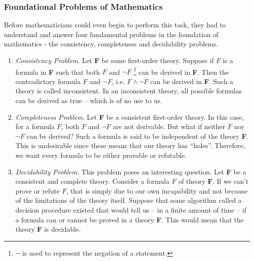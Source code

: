 \documentclass[a4paper, 12pt]{article}
\theoremstyle{definition}
\begin{document}
    \subsubsection*{Foundational Problems of Mathematics}
    \vspace{-0.75 em}
    Before mathematicians could even begin to perform this task, they had to understand and answer four fundamental 
    problems in the foundation of mathematics - the consistency, completeness and decidability problems. 
    \vspace{-0.75 em}
    \begin{enumerate}
        \item \textit{Consistency Problem}. Let \textbf{F} be some first-order theory. Suppose if $F$ is a formula in \textbf{F} such that 
        both $F$ and $\neg F$ \footnote{$\neg$ is used to represent the negation of a statement.} can be derived in \textbf{F}. Then the 
        contradictory formula $F$ and $\neg F$, i.e. $F \land \neg F$ can be derived in \textbf{F}. Such a theory is 
        called inconsistent. In an inconsistent theory, all possible formulas can be derived as true -- which is of no use to us. 
        \vspace{-0.3 em}        
        \item \textit{Completeness Problem}. Let \textbf{F} be a consistent first-order theory. In this case, for a formula $F$, both $F$ and $\neg F$ 
        are not derivable. But what if neither $F$ nor $\neg F$ can be derived? Such a formula is said to be independent of the theory \textbf{F}. This is undesirable 
        since these means that our theory has ``holes''. Therefore, we want every formula to be either provable or refutable.    
        \vspace{-0.3 em}
        \item \textit{Decidability Problem}. This problem poses an interesting question. Let \textbf{F} be a consistent and complete 
        theory. Consider a formula $F$ of theory \textbf{F}. If we can't prove or refute $F$, that is simply due to our own 
        incapability and not because of the limitations of the theory itself. Suppose that some algorithm called a decision procedure 
        existed that would tell us -- in a finite amount of time -- if a formula can or cannot be proved in a theory \textbf{F}. This would mean 
        that the theory \textbf{F} is decidable.    
    \end{enumerate} 
\end{document}
